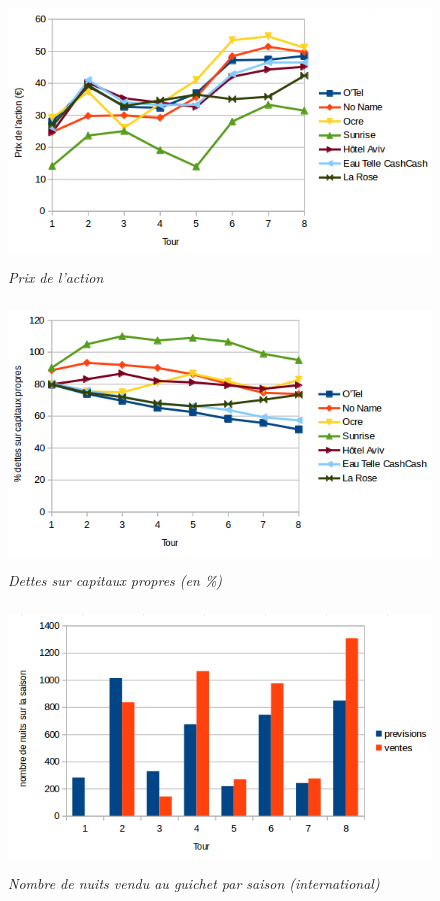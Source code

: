 \documentclass[a4paper,10pt]{article}
\begin{document}
    \begin{figure}[!ht]
      \begin{center}
	\includegraphics[height=7cm,keepaspectratio]{./images/action.png}
      \end{center}
      \caption{\textit{Prix de l'action}}
    \end{figure}
        
    \begin{figure}[!ht]
      \begin{center}
	\includegraphics[height=7.0cm,keepaspectratio]{./images/dettes_capitaux.png}
      \end{center}
      \caption{\textit{Dettes sur capitaux propres (en \%)}}
    \end{figure}
    
    \begin{figure}[!ht]
      \begin{center}
	\includegraphics[height=7.0cm,keepaspectratio]{./images/ventes_internationales.png}
      \end{center}
      \caption{\textit{Nombre de nuits vendu au guichet par saison (international)}}
      \label{ventes_internationales}
    \end{figure}
\end{document}
